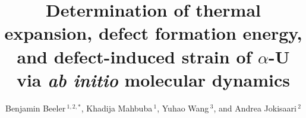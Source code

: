 \documentclass[utf8]{frontiersSCNS} %
\def\firstAuthorLast{Beeler {et~al.}}
\def\Authors{Benjamin Beeler\,$^{1,2,*}$, Khadija Mahbuba\,$^{1}$, Yuhao Wang\,$^{3}$, and Andrea Jokisaari\,$^{2}$} %
\begin{document}
\onecolumn
{}

\title[AIMD calculation of temperature-dependent properties of $\alpha$-U]{Determination of thermal expansion, defect formation energy, and defect-induced strain of $\alpha$-U via \textit{ab initio} molecular dynamics} 

\author[\firstAuthorLast ]{\Authors} %
\address{} %
\correspondance{} %

\extraAuth{}%

\maketitle
\end{document}
